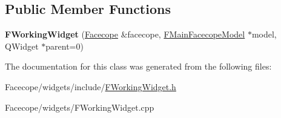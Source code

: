 \subsection*{Public Member Functions}
\begin{DoxyCompactItemize}
\item 
\mbox{\label{classFWorkingWidget_a288d354166017dc56788e63c6fe1f97f}} 
{\bfseries F\+Working\+Widget} (\hyperlink{structFacecope}{Facecope} \&facecope, \hyperlink{classFMainFacecopeModel}{F\+Main\+Facecope\+Model} $\ast$model, Q\+Widget $\ast$parent=0)
\end{DoxyCompactItemize}


The documentation for this class was generated from the following files\+:\begin{DoxyCompactItemize}
\item 
Facecope/widgets/include/\hyperlink{FWorkingWidget_8h}{F\+Working\+Widget.\+h}\item 
Facecope/widgets/F\+Working\+Widget.\+cpp\end{DoxyCompactItemize}
